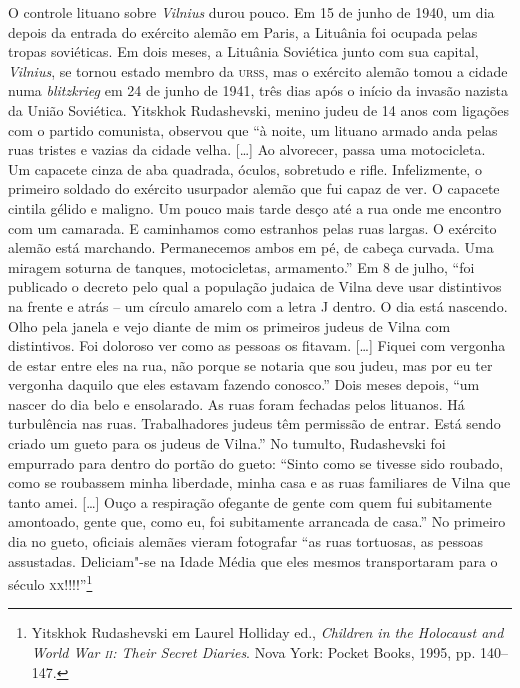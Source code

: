 O controle lituano sobre \textit{Vilnius} durou pouco. Em 15 de junho de 1940, um
dia depois da entrada do exército alemão em Paris, a Lituânia foi
ocupada pelas tropas soviéticas. Em dois meses, a Lituânia Soviética
junto com sua capital, \textit{Vilnius}, se tornou estado membro da \textsc{urss}, mas o
exército alemão tomou a cidade numa \textit{blitzkrieg} em 24 de junho de
1941, três dias após o início da invasão nazista da União Soviética.
Yitskhok Rudashevski, menino judeu de 14 anos com ligações com o partido
comunista, observou que ``à noite, um lituano armado anda pelas ruas
tristes e vazias da cidade velha. [\ldots{}] Ao alvorecer, passa uma
motocicleta. Um capacete cinza de aba quadrada, óculos, sobretudo e
rifle. Infelizmente, o primeiro soldado do exército usurpador alemão que
fui capaz de ver. O capacete cintila gélido e maligno. Um pouco mais
tarde desço até a rua onde me encontro com um camarada. E
caminhamos como estranhos pelas ruas largas. O exército alemão está
marchando. Permanecemos ambos em pé, de cabeça curvada. Uma miragem
soturna de tanques, motocicletas, armamento.'' Em 8 de julho, ``foi
publicado o decreto pelo qual a população judaica de Vilna deve usar
distintivos na frente e atrás -- um círculo amarelo com a letra J dentro.
O dia está nascendo. Olho pela janela e vejo diante de mim os primeiros
judeus de Vilna com distintivos. Foi doloroso ver como as pessoas os
fitavam. [\ldots{}] Fiquei com vergonha de estar entre eles na rua, não
porque se notaria que sou judeu, mas por eu ter vergonha daquilo que
eles estavam fazendo conosco.'' Dois meses depois, ``um nascer do
dia belo e ensolarado. As ruas foram fechadas pelos lituanos. Há
turbulência nas ruas. Trabalhadores judeus têm permissão de entrar. Está
sendo criado um gueto para os judeus de Vilna.'' No tumulto, Rudashevski
foi empurrado para dentro do portão do gueto: ``Sinto como se tivesse
sido roubado, como se roubassem minha liberdade, minha casa e as ruas
familiares de Vilna que tanto amei. [\ldots{}] Ouço a respiração ofegante
de gente com quem fui subitamente amontoado, gente que, como eu, foi
subitamente arrancada de casa.'' No primeiro dia no gueto, oficiais
alemães vieram fotografar ``as ruas tortuosas, as pessoas assustadas.
Deliciam"-se na Idade Média que eles mesmos transportaram para o século
\textsc{xx}!!!!''\footnote{Yitskhok Rudashevski em Laurel Holliday ed., \textit{Children in the Holocaust and World War \textsc{ii}: Their Secret Diaries}. Nova York: Pocket Books, 1995, pp. 140--147.}

